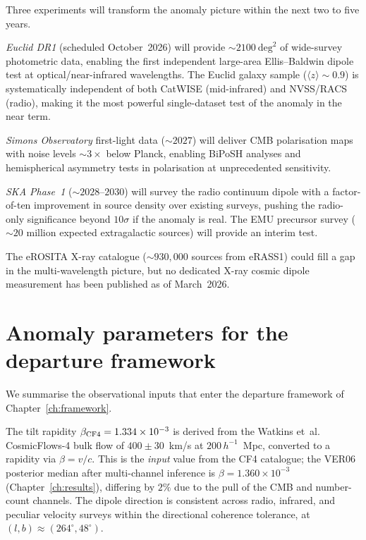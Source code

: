 Three experiments will transform the anomaly picture within
the next two to five years.

\emph{Euclid DR1} (scheduled October~2026) will provide
$\sim\!2100~\mathrm{deg}^2$ of wide-survey photometric data,
enabling the first independent large-area Ellis--Baldwin
dipole test at optical/near-infrared wavelengths.  The Euclid
galaxy sample ($\langle z \rangle \sim 0.9$) is
systematically independent of both CatWISE (mid-infrared) and
NVSS/RACS (radio), making it the most powerful single-dataset
test of the anomaly in the near term.

\emph{Simons Observatory} first-light data
($\sim\!2027$) will deliver CMB polarisation maps with noise
levels $\sim\!3\times$ below Planck, enabling BiPoSH analyses
and hemispherical asymmetry tests in polarisation at
unprecedented sensitivity.

\emph{SKA Phase~1} ($\sim\!2028$--$2030$) will survey the
radio continuum dipole with a factor-of-ten improvement in
source density over existing surveys, pushing the radio-only
significance beyond $10\sigma$ if the anomaly is real.  The
EMU precursor survey ($\sim\!20$ million expected
extragalactic sources) will provide an interim test.

The eROSITA X-ray catalogue ($\sim\!930{,}000$ sources from
eRASS1) could fill a gap in the multi-wavelength picture, but
no dedicated X-ray cosmic dipole measurement has been
published as of March~2026.


\section{Anomaly parameters for the departure framework}
\label{sec:dipole-summary}
\label{sec:reframing}

We summarise the observational inputs that enter the departure
framework of Chapter~\ref{ch:framework}.

The tilt rapidity $\beta_{\rm CF4} = 1.334 \times 10^{-3}$
is derived from the Watkins et~al.~\cite{Watkins2023}
CosmicFlows-4 bulk flow of $400 \pm 30$~km/s at
$200\,h^{-1}$~Mpc, converted to a rapidity via
$\beta = v/c$.  This is the \emph{input} value from the
CF4 catalogue; the VER06 posterior median after
multi-channel inference is
$\beta = 1.360 \times 10^{-3}$
(Chapter~\ref{ch:results}), differing by $2\%$ due to
the pull of the CMB and number-count channels.
The dipole direction is consistent across
radio, infrared, and peculiar velocity surveys within the
directional coherence tolerance, at
$(l, b) \approx (264^\circ, 48^\circ)$.

